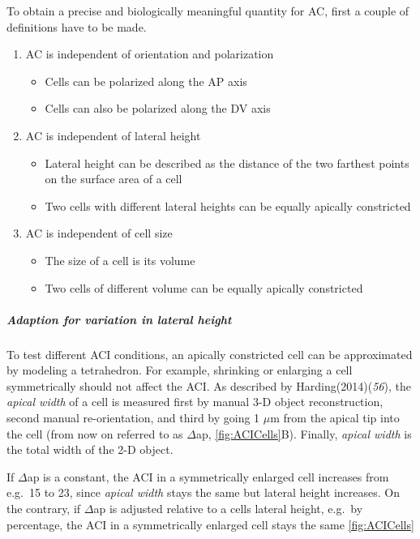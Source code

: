 \documentclass[11pt,singlespacinge,twoside]{reedthesis} %
\providecommand{\tightlist}{%
  \setlength{\itemsep}{0pt}\setlength{\parskip}{0pt}}
\begin{document}
To obtain a precise and biologically meaningful quantity for AC, first a couple of definitions have to be made.
\begin{enumerate}
\def\labelenumi{\arabic{enumi}.}
\tightlist
\item
  AC is independent of orientation and polarization
  \begin{itemize}
  \tightlist
  \item
    Cells can be polarized along the AP axis
  \item
    Cells can also be polarized along the DV axis
  \end{itemize}
\item
  AC is independent of lateral height
  \begin{itemize}
  \tightlist
  \item
    Lateral height can be described as the distance of the two farthest points on the surface area of a cell
  \item
    Two cells with different lateral heights can be equally apically constricted
  \end{itemize}
\item
  AC is independent of cell size
  \begin{itemize}
  \tightlist
  \item
    The size of a cell is its volume
  \item
    Two cells of different volume can be equally apically constricted
  \end{itemize}
\end{enumerate}
\hypertarget{ACI-lat}{%
\subparagraph{Adaption for variation in lateral height}\label{ACI-lat}}

To test different ACI conditions, an apically constricted cell can be approximated by modeling a tetrahedron. For example, shrinking or enlarging a cell symmetrically should not affect the ACI. As described by Harding(2014)(\emph{56}), the \emph{apical width} of a cell is measured first by manual 3-D object reconstruction, second manual re-orientation, and third by going 1 \(\mu\)m from the apical tip into the cell (from now on referred to as \(\Delta\)ap, \ref{fig:ACICells}B). Finally, \emph{apical width} is the total width of the 2-D object.

If \(\Delta\)ap is a constant, the ACI in a symmetrically enlarged cell increases from e.g.~15 to 23, since \emph{apical width} stays the same but lateral height increases. On the contrary, if \(\Delta\)ap is adjusted relative to a cells lateral height, e.g.~by percentage, the ACI in a symmetrically enlarged cell stays the same \ref{fig:ACICells}
\end{document}
